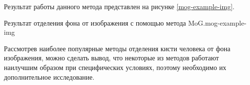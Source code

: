 Результат работы данного метода представлен на рисунке
\ref{mog-example-img}.

{Результат отделения фона от изображения с помощью метода MoG.}{mog-example-img}

\bigskip

Рассмотрев наиболее популярные методы отделения кисти человека от фона изображения, можно сделать
вывод, что некоторые из методов работают наилучшим образом при специфических условиях, поэтому
необходимо их дополнительное исследование. 









